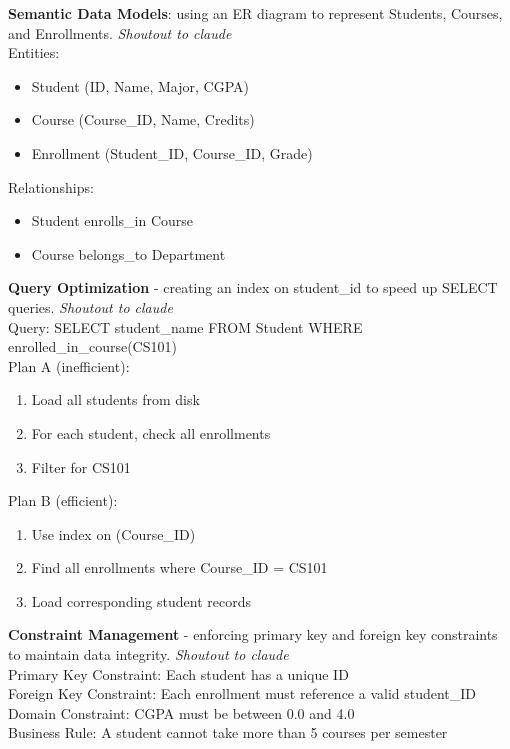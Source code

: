 \begin{bsp}
    \textbf{Semantic Data Models}: using an ER diagram to represent Students,
    Courses, and Enrollments. \textit{Shoutout to claude} \\
    Entities:
    \begin{itemize}
        \item Student (ID, Name, Major, CGPA)
        \item Course (Course\_ID, Name, Credits)
        \item Enrollment (Student\_ID, Course\_ID, Grade)
    \end{itemize}
    Relationships:
    \begin{itemize}
        \item Student enrolls\_in Course
        \item Course belongs\_to Department
    \end{itemize}
\end{bsp}

\begin{bsp}
    \textbf{Query Optimization} - creating an index on student\_id to speed up
    SELECT queries. \textit{Shoutout to claude} \\
    Query: SELECT student\_name FROM Student WHERE enrolled\_in\_course(CS101) \\
    Plan A (inefficient): \\
    \begin{enumerate}
        \item Load all students from disk
        \item For each student, check all enrollments
        \item Filter for CS101
    \end{enumerate}
    Plan B (efficient): \\
    \begin{enumerate}
        \item Use index on (Course\_ID)
        \item Find all enrollments where Course\_ID = CS101
        \item Load corresponding student records

    \end{enumerate}

\end{bsp}


\begin{bsp}
    \textbf{Constraint Management} - enforcing primary key and foreign key
    constraints to maintain data integrity. \textit{Shoutout to claude} \\
    Primary Key Constraint: Each student has a unique ID \\
    Foreign Key Constraint: Each enrollment must reference a valid student\_ID \\
    Domain Constraint: CGPA must be between 0.0 and 4.0 \\
    Business Rule: A student cannot take more than 5 courses per semester \\
\end{bsp}

